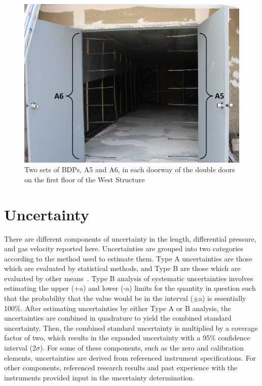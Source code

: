\documentclass[12pt,oneside]{book}
\begin{document}
\begin{figure}[!ht]
\includegraphics[width=6in]{../Pictures/BDPs}
\caption[Two sets of BDPs in Doorway]{Two sets of BDPs, A5 and A6, in each doorway of the double doors on the first floor of the West Structure}
\label{fig:BDPs}
\end{figure}

\section{Uncertainty}
\label{sec:Uncertainty}
There are different components of uncertainty in the length, differential pressure, and gas velocity reported here. Uncertainties are grouped into two categories according to the method used to estimate them. Type A uncertainties are those which are evaluated by statistical methods, and Type B are those which are evaluated by other means~\cite{Taylor&Kuyatt:1994}. Type B analysis of systematic uncertainties involves estimating the upper (+a) and lower (-a) limits for the quantity in question such that the probability that the value would be in the interval ($\pm$a) is essentially 100\%. After estimating uncertainties by either Type A or B analysis, the uncertainties are combined in quadrature to yield the combined standard uncertainty. Then, the combined standard uncertainty is multiplied by a coverage factor of two, which results in the expanded uncertainty with a 95\% confidence interval (2$\sigma$). For some of these components, such as the zero and calibration elements, uncertainties are derived from referenced instrument specifications. For other components, referenced research results and past experience with the instruments provided input in the uncertainty determination. 
\end{document}
